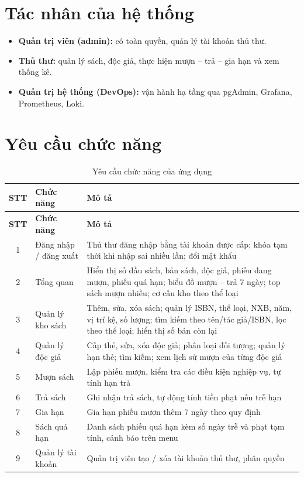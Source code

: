 \documentclass[../main.tex]{subfiles}
\begin{document}
\section{Tác nhân của hệ thống}
\begin{itemize}
    \item \textbf{Quản trị viên (admin):} có toàn quyền, quản lý tài khoản thủ thư.
    \item \textbf{Thủ thư:} quản lý sách, độc giả, thực hiện mượn -- trả -- gia hạn và xem thống kê.
    \item \textbf{Quản trị hệ thống (DevOps):} vận hành hạ tầng qua pgAdmin, Grafana, Prometheus, Loki.
\end{itemize}

\section{Yêu cầu chức năng}
\begin{longtable}{|c|p{3.6cm}|p{9.8cm}|}
\caption{Yêu cầu chức năng của ứng dụng}
\label{tab:yeu-cau-chuc-nang}\\
\hline
\textbf{STT} & \textbf{Chức năng} & \textbf{Mô tả} \\
\hline
\endfirsthead
\hline
\textbf{STT} & \textbf{Chức năng} & \textbf{Mô tả} \\
\hline
\endhead
1 & Đăng nhập / đăng xuất & Thủ thư đăng nhập bằng tài khoản được cấp; khóa tạm thời khi nhập sai nhiều lần; đổi mật khẩu \\ \hline
2 & Tổng quan & Hiển thị số đầu sách, bản sách, độc giả, phiếu đang mượn, phiếu quá hạn; biểu đồ mượn -- trả 7 ngày; top sách mượn nhiều; cơ cấu kho theo thể loại \\ \hline
3 & Quản lý kho sách & Thêm, sửa, xóa sách; quản lý ISBN, thể loại, NXB, năm, vị trí kệ, số lượng; tìm kiếm theo tên/tác giả/ISBN, lọc theo thể loại; hiển thị số bản còn lại \\ \hline
4 & Quản lý độc giả & Cấp thẻ, sửa, xóa độc giả; phân loại đối tượng; quản lý hạn thẻ; tìm kiếm; xem lịch sử mượn của từng độc giả \\ \hline
5 & Mượn sách & Lập phiếu mượn, kiểm tra các điều kiện nghiệp vụ, tự tính hạn trả \\ \hline
6 & Trả sách & Ghi nhận trả sách, tự động tính tiền phạt nếu trễ hạn \\ \hline
7 & Gia hạn & Gia hạn phiếu mượn thêm 7 ngày theo quy định \\ \hline
8 & Sách quá hạn & Danh sách phiếu quá hạn kèm số ngày trễ và phạt tạm tính, cảnh báo trên menu \\ \hline
9 & Quản lý tài khoản & Quản trị viên tạo / xóa tài khoản thủ thư, phân quyền \\ \hline
\end{longtable}
\end{document}
